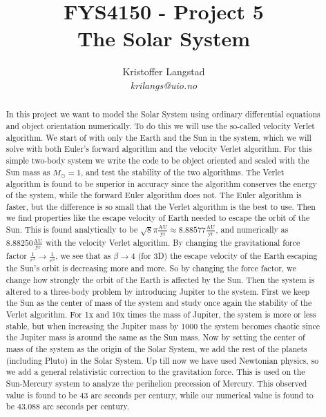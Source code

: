 \documentclass[12pt,a4paper,english]{article}
\title{FYS4150 - Project 5\\
The Solar System}
\date{}
\author{ Kristoffer Langstad\\ \textit{krilangs@uio.no}}
\begin{document}
\maketitle
\begin{abstract}
	In this project we want to model the Solar System using ordinary differential equations and object orientation numerically. To do this we will use the so-called velocity Verlet algorithm. We start of with only the Earth and the Sun in the system, which we will solve with both Euler's forward algorithm and the velocity Verlet algorithm. For this simple two-body system we write the code to be object oriented and scaled with the Sun mass as $M_\odot=1$, and test the stability of the two algorithms. The Verlet algorithm is found to be superior in accuracy since the algorithm conserves the energy of the system, while the forward Euler algorithm does not. The Euler algorithm is faster, but the difference is so small that the Verlet algorithm is the best to use. Then we find properties like the escape velocity of Earth needed to escape the orbit of the Sun. This is found analytically to be $\sqrt{8}\pi\frac{\text{AU}}{\text{yr}}\approx8.88577\frac{\text{AU}}{\text{yr}}$, and numerically as $8.88250\frac{\text{AU}}{\text{yr}}$ with the velocity Verlet algorithm. By changing the gravitational force factor $\frac{1}{r^3}\rightarrow\frac{1}{r^{\beta}}$, we see that as $\beta\rightarrow4$ (for 3D) the escape velocity of the Earth escaping the Sun's orbit is decreasing more and more. So by changing the force factor, we change how strongly the orbit of the Earth is affected by the Sun. Then the system is altered to a three-body problem by introducing Jupiter to the system. First we keep the Sun as the center of mass of the system and study once again the stability of the Verlet algorithm. For 1x and 10x times the mass of Jupiter, the system is more or less stable, but when increasing the Jupiter mass by 1000 the system becomes chaotic since the Jupiter mass is around the same as the Sun mass. Now by setting the center of mass of the system as the origin of the Solar System, we add the rest of the planets (including Pluto) in the Solar System. Up till now we have used Newtonian physics, so we add a general relativistic correction to the gravitation force. This is used on the Sun-Mercury system to analyze the perihelion precession of Mercury. This observed value is found to be 43 arc seconds per century, while our numerical value is found to be 43.088 arc seconds per century.
\end{abstract}
\end{document}
